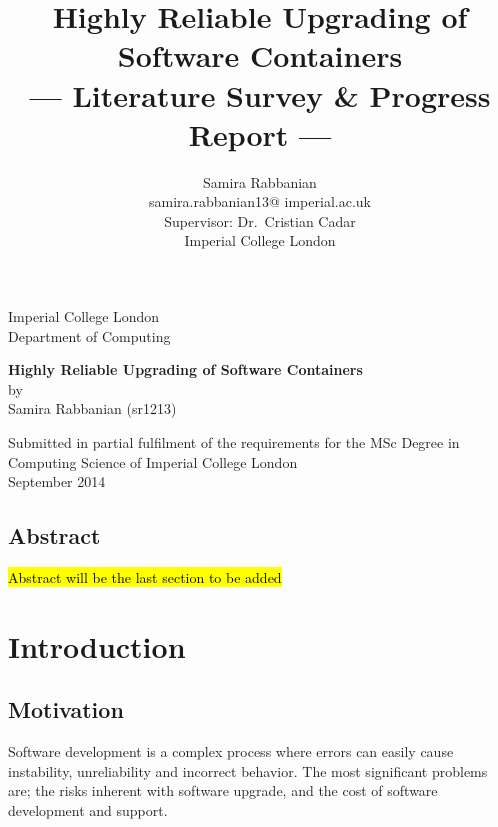 \documentclass[a4paper,11pt,twoside]{report}
\title{Highly Reliable Upgrading of Software Containers\\\Large{--- Literature Survey \& Progress Report ---}}
\author{Samira Rabbanian\\
  samira.rabbanian13@ imperial.ac.uk \\
  \small{Supervisor: Dr.\ Cristian Cadar}\\
  \small{Imperial College London}}
\newcommand\blankpage{%
\null
\thispagestyle{empty}%
\addtocounter{page}{-1}%
\newpage}
\begin{document}
\maketitle

\begin{titlepage}
    \begin{center}
        \vspace*{2cm}
        
        \large
        {\Large Imperial College London}\\
        \large
         \vspace*{0.2cm}
        {\Large Department of Computing}
        
        \vspace{4.5 cm}
        \large
        {\huge \textbf{Highly Reliable Upgrading of Software Containers}}\\
        \vspace{1.0 cm}
        {\Large by}\\
        {\Large Samira Rabbanian (sr1213)}
        
        \vspace{10cm}
        

  	\large {\Large Submitted in partial fulfilment of the requirements for the MSc Degree in Computing Science of Imperial College London }\\
  	
\vspace*{1 cm}  	
  \large{\Large September 2014}\\ 
           
    \end{center}
\end{titlepage}
\afterpage{\blankpage}
\clearpage

\section*{Abstract}
\hl{Abstract will be the last section to be added}
\clearpage


\afterpage{\blankpage}
\tableofcontents
\clearpage

\listoffigures
\clearpage

\chapter{Introduction}
\section{Motivation}
Software development is a complex process where errors can easily cause instability, unreliability and incorrect behavior. The most significant problems are; the risks inherent with software upgrade, and the cost of software development and support. 
 
\end{document}
